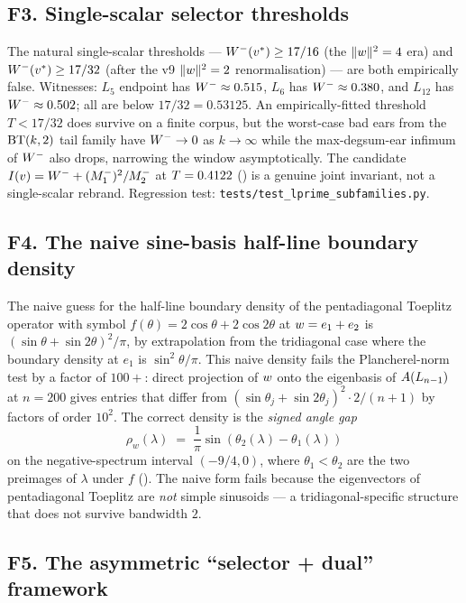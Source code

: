 \subsection{F3. Single-scalar selector thresholds}\label{sec:fm:single-scalar}

The natural single-scalar thresholds — $W^{-}(v^{*}) \ge 17/16$ (the
$\|w\|^{2} = 4$ era) and $W^{-}(v^{*}) \ge 17/32$ (after the v9
$\|w\|^{2} = 2$ renormalisation) — are both empirically false.
Witnesses: $L_{5}$ endpoint has $W^{-} \approx 0.515$, $L_{6}$ has
$W^{-} \approx 0.380$, and $L_{12}$ has $W^{-} \approx 0.502$; all are
below $17/32 = 0.53125$. An empirically-fitted
threshold $T < 17/32$ does survive on a finite corpus, but the
worst-case bad ears from the $\mathrm{BT}(k,2)$ tail family have
$W^{-} \to 0$ as $k \to \infty$ while the max-degsum-ear infimum of
$W^{-}$ also drops, narrowing the window asymptotically. The candidate
$I(v) = W^{-} + (M_{1}^{-})^{2}/M_{2}^{-}$ at $T = 0.4122$
() is a genuine joint invariant, not a
single-scalar rebrand. Regression test:
\texttt{tests/test\_lprime\_subfamilies.py}.

\subsection{F4. The naive sine-basis half-line boundary density}\label{sec:fm:sine-basis}

The naive guess for the half-line boundary density of the pentadiagonal
Toeplitz operator with symbol $f(\theta) = 2\cos\theta + 2\cos 2\theta$
at $w = e_{1} + e_{2}$ is $(\sin\theta + \sin 2\theta)^{2}/\pi$, by
extrapolation from the tridiagonal case where the boundary density at
$e_{1}$ is $\sin^{2}\theta / \pi$. This naive density fails the
Plancherel-norm test by a factor of $100+$: direct projection of $w$
onto the eigenbasis of $A(L_{n-1})$ at $n = 200$ gives entries that
differ from $(\sin\theta_{j} + \sin 2\theta_{j})^{2} \cdot 2/(n+1)$ by
factors of order $10^{2}$. The correct density is the \emph{signed
angle gap}
\[
\rho_{w}(\lambda) \;=\; \frac{1}{\pi}\sin(\theta_{2}(\lambda) - \theta_{1}(\lambda))
\]
on the negative-spectrum interval $(-9/4, 0)$, where
$\theta_{1} < \theta_{2}$ are the two preimages of $\lambda$ under
$f$ (). The naive form fails because the
eigenvectors of pentadiagonal Toeplitz are \emph{not} simple sinusoids
— a tridiagonal-specific structure that does not survive bandwidth $2$.

\subsection{F5. The asymmetric ``selector + dual'' framework}\label{sec:fm:asymmetric-dual}

